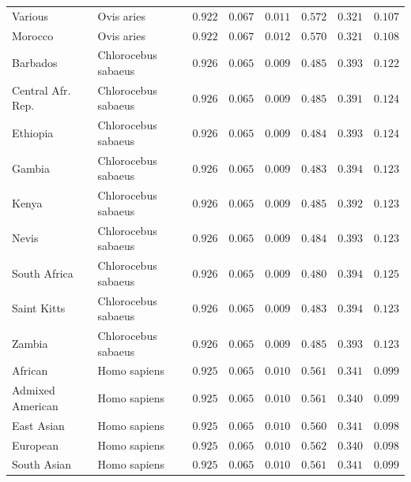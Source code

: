 \documentclass{article}
\begin{document}
\begin{center}
\begin{longtable*}{|l|l|r|r|r|r|r|r|}
            Various & Ovis aries & $ 0.922$ & $ 0.067$ & $ 0.011$ & $ 0.572$ & $ 0.321$ & $ 0.107$ \\
            Morocco & Ovis aries & $ 0.922$ & $ 0.067$ & $ 0.012$ & $ 0.570$ & $ 0.321$ & $ 0.108$ \\
             Barbados & Chlorocebus sabaeus & $ 0.926$ & $ 0.065$ & $ 0.009$ & $ 0.485$ & $ 0.393$ & $ 0.122$ \\
             Central Afr. Rep. & Chlorocebus sabaeus & $ 0.926$ & $ 0.065$ & $ 0.009$ & $ 0.485$ & $ 0.391$ & $ 0.124$ \\
             Ethiopia & Chlorocebus sabaeus & $ 0.926$ & $ 0.065$ & $ 0.009$ & $ 0.484$ & $ 0.393$ & $ 0.124$ \\
             Gambia & Chlorocebus sabaeus & $ 0.926$ & $ 0.065$ & $ 0.009$ & $ 0.483$ & $ 0.394$ & $ 0.123$ \\
             Kenya & Chlorocebus sabaeus & $ 0.926$ & $ 0.065$ & $ 0.009$ & $ 0.485$ & $ 0.392$ & $ 0.123$ \\
             Nevis & Chlorocebus sabaeus & $ 0.926$ & $ 0.065$ & $ 0.009$ & $ 0.484$ & $ 0.393$ & $ 0.123$ \\
             South Africa & Chlorocebus sabaeus & $ 0.926$ & $ 0.065$ & $ 0.009$ & $ 0.480$ & $ 0.394$ & $ 0.125$ \\
             Saint Kitts & Chlorocebus sabaeus & $ 0.926$ & $ 0.065$ & $ 0.009$ & $ 0.483$ & $ 0.394$ & $ 0.123$ \\
             Zambia & Chlorocebus sabaeus & $ 0.926$ & $ 0.065$ & $ 0.009$ & $ 0.485$ & $ 0.393$ & $ 0.123$ \\
            African & Homo sapiens & $ 0.925$ & $ 0.065$ & $ 0.010$ & $ 0.561$ & $ 0.341$ & $ 0.099$ \\
            Admixed American & Homo sapiens & $ 0.925$ & $ 0.065$ & $ 0.010$ & $ 0.561$ & $ 0.340$ & $ 0.099$ \\
            East Asian & Homo sapiens & $ 0.925$ & $ 0.065$ & $ 0.010$ & $ 0.560$ & $ 0.341$ & $ 0.098$ \\
            European & Homo sapiens & $ 0.925$ & $ 0.065$ & $ 0.010$ & $ 0.562$ & $ 0.340$ & $ 0.098$ \\
            South Asian & Homo sapiens & $ 0.925$ & $ 0.065$ & $ 0.010$ & $ 0.561$ & $ 0.341$ & $ 0.099$ \\
        \end{longtable*}

\end{center}
\end{document}
